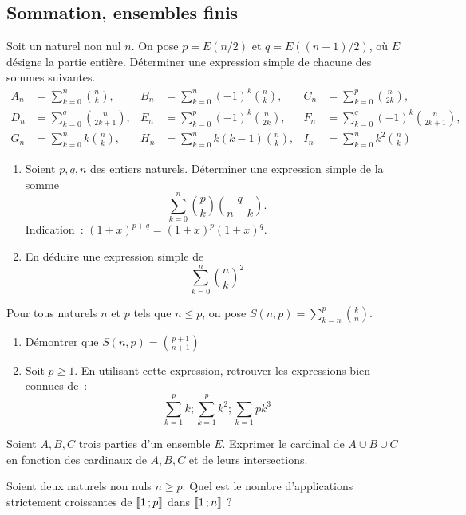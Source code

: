 \subsection{Sommation, ensembles finis}
\begin{exercice}
    Soit un naturel non nul \(n\). On pose \(p = E(n/2)\) et \(q = E((n-1)/2)\), où \(E\) désigne la partie entière. Déterminer une expression simple de chacune des sommes suivantes.
    \begin{align*}
        A_n &= \sum_{k=0}^n \binom{n}{k}, & B_n&=\sum_{k=0}^n (-1)^k\binom{n}{k}, & C_n&=\sum_{k=0}^p \binom{n}{2k}, \\
        D_n &= \sum_{k=0}^q \binom{n}{2k+1}, & E_n&=\sum_{k=0}^p (-1)^k\binom{n}{2k}, & F_n&=\sum_{k=0}^q (-1)^k\binom{n}{2k+1}, \\
        G_n &= \sum_{k=0}^n k\binom{n}{k}, & H_n&=\sum_{k=0}^n k(k-1)\binom{n}{k}, & I_n&=\sum_{k=0}^n k^2\binom{n}{k}
    \end{align*}
\end{exercice}
\begin{exercice}
    \begin{enumerate}
        \item Soient \(p, q, n\) des entiers naturels. Déterminer une expression simple de la somme \[\sum_{k=0}^n \binom{p}{k}\binom{q}{n-k}.\] Indication~: \((1+x)^{p+q} = (1+x)^p (1+x)^q\).
        \item En déduire une expression simple de \[\sum_{k=0}^n \binom{n}{k}^2\]
    \end{enumerate}
\end{exercice}
\begin{exercice}
    Pour tous naturels \(n\) et \(p\) tels que \(n \leqslant p\), on pose \(S(n,p) = \sum_{k=n}^p \binom{k}{n}\).
    \begin{enumerate}
        \item Démontrer que \(S(n,p) = \binom{p+1}{n+1}\)
        \item Soit \(p \geqslant 1\). En utilisant cette expression, retrouver les expressions bien connues de~:\[\sum_{k=1}^p k ; \sum_{k=1}^p k^2 ; \sum_{k=1}{p} k^3\]
    \end{enumerate}
\end{exercice}
\begin{exercice}
    Soient \(A, B, C\) trois parties d'un ensemble \(E\). Exprimer le cardinal de \(A \cup B \cup C\) en fonction des cardinaux de \(A, B, C\) et de leurs intersections.
\end{exercice}
\begin{exercice}
    Soient deux naturels non nuls \(n\geqslant p\). Quel est le nombre d'applications strictement croissantes de \(\mathopen{\llbracket}1\mathclose{}\mathpunct{};p\mathclose{\rrbracket}\) dans \(\mathopen{\llbracket}1\mathclose{}\mathpunct{};n\mathclose{\rrbracket}\) ?
\end{exercice}
